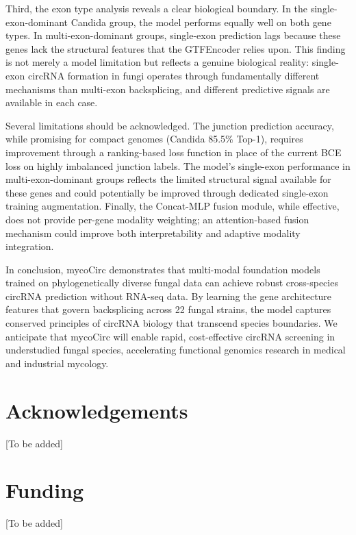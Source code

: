 \documentclass[12pt]{article}
\begin{document}
Third, the exon type analysis reveals a clear biological boundary. In the single-exon-dominant Candida group, the model performs equally well on both gene types. In multi-exon-dominant groups, single-exon prediction lags because these genes lack the structural features that the GTFEncoder relies upon. This finding is not merely a model limitation but reflects a genuine biological reality: single-exon circRNA formation in fungi operates through fundamentally different mechanisms than multi-exon backsplicing, and different predictive signals are available in each case.

Several limitations should be acknowledged. The junction prediction accuracy, while promising for compact genomes (Candida 85.5\% Top-1), requires improvement through a ranking-based loss function in place of the current BCE loss on highly imbalanced junction labels. The model's single-exon performance in multi-exon-dominant groups reflects the limited structural signal available for these genes and could potentially be improved through dedicated single-exon training augmentation. Finally, the Concat-MLP fusion module, while effective, does not provide per-gene modality weighting; an attention-based fusion mechanism could improve both interpretability and adaptive modality integration.

In conclusion, mycoCirc demonstrates that multi-modal foundation models trained on phylogenetically diverse fungal data can achieve robust cross-species circRNA prediction without RNA-seq data. By learning the gene architecture features that govern backsplicing across 22 fungal strains, the model captures conserved principles of circRNA biology that transcend species boundaries. We anticipate that mycoCirc will enable rapid, cost-effective circRNA screening in understudied fungal species, accelerating functional genomics research in medical and industrial mycology.

\section*{Acknowledgements}

[To be added]

\section*{Funding}

[To be added]
\end{document}
